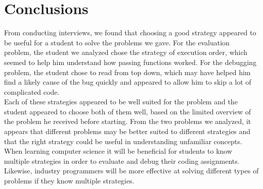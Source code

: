 \section{Conclusions}
From conducting interviews, we found that choosing a good strategy appeared to be useful for a student to solve the problems we gave. 
For the evaluation problem, the student we analyzed chose the strategy of execution order, which seemed to help him understand how passing functions worked. 
For the debugging problem, the student chose to read from top down, which may have helped him find a likely cause of the bug quickly and appeared to allow him to skip a lot of complicated code.  \\

Each of these strategies appeared to be well suited for the problem and the student appeared to choose both of them well, based on the limited overview of the problem he received before starting. 
From the two problems we analyzed, it appears that different problems may be better suited to different strategies and that the right strategy could be useful in understanding unfamiliar concepts. 
When learning computer science it will be beneficial for students to know multiple strategies in order to evaluate and debug their coding assignments. Likewise, industry programmers will be more effective at solving different types of problems if they know multiple strategies. \\

